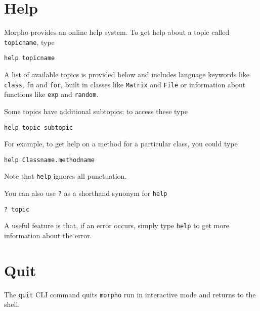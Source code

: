 \hypertarget{help}{%
\section{Help}\label{help}}

Morpho provides an online help system. To get help about a topic called
\texttt{topicname}, type

\begin{lstlisting}
help topicname
\end{lstlisting}

A list of available topics is provided below and includes language
keywords like \texttt{class}, \texttt{fn} and \texttt{for}, built in
classes like \texttt{Matrix} and \texttt{File} or information about
functions like \texttt{exp} and \texttt{random}.

Some topics have additional subtopics: to access these type

\begin{lstlisting}
help topic subtopic
\end{lstlisting}

For example, to get help on a method for a particular class, you could
type

\begin{lstlisting}
help Classname.methodname
\end{lstlisting}

Note that \texttt{help} ignores all punctuation.

You can also use \texttt{?} as a shorthand synonym for \texttt{help}

\begin{lstlisting}
? topic
\end{lstlisting}

A useful feature is that, if an error occurs, simply type \texttt{help}
to get more information about the error.

\hypertarget{quit}{%
\section{Quit}\label{quit}}

The \texttt{quit} CLI command quits \texttt{morpho} run in interactive
mode and returns to the shell.
